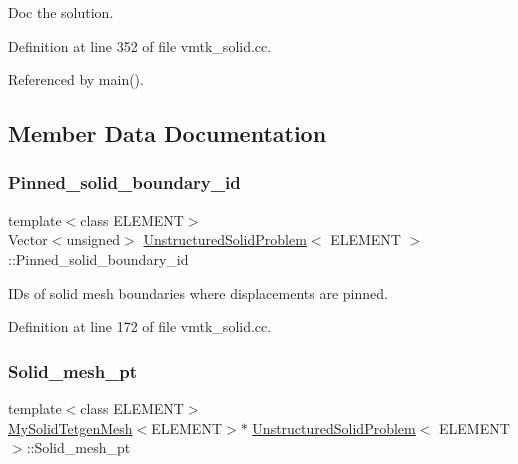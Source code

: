 Doc the solution. 



Definition at line 352 of file vmtk\+\_\+solid.\+cc.



Referenced by main().



\subsection{Member Data Documentation}
\mbox{\label{classUnstructuredSolidProblem_a62ea7d593eaac6a3a0f0455c4a3fd805}} 
\subsubsection{\texorpdfstring{Pinned\+\_\+solid\+\_\+boundary\+\_\+id}{Pinned\_solid\_boundary\_id}}
{\footnotesize\ttfamily template$<$class E\+L\+E\+M\+E\+NT$>$ \\
Vector$<$unsigned$>$ \hyperlink{classUnstructuredSolidProblem}{Unstructured\+Solid\+Problem}$<$ E\+L\+E\+M\+E\+NT $>$\+::Pinned\+\_\+solid\+\_\+boundary\+\_\+id\hspace{0.3cm}{\ttfamily [private]}}



I\+Ds of solid mesh boundaries where displacements are pinned. 



Definition at line 172 of file vmtk\+\_\+solid.\+cc.

\mbox{\label{classUnstructuredSolidProblem_ad6a8cbe2c2f3596385e1a2484bfb68f7}} 
\subsubsection{\texorpdfstring{Solid\+\_\+mesh\+\_\+pt}{Solid\_mesh\_pt}}
{\footnotesize\ttfamily template$<$class E\+L\+E\+M\+E\+NT$>$ \\
\hyperlink{classMySolidTetgenMesh}{My\+Solid\+Tetgen\+Mesh}$<$E\+L\+E\+M\+E\+NT$>$$\ast$ \hyperlink{classUnstructuredSolidProblem}{Unstructured\+Solid\+Problem}$<$ E\+L\+E\+M\+E\+NT $>$\+::Solid\+\_\+mesh\+\_\+pt\hspace{0.3cm}{\ttfamily [private]}}



